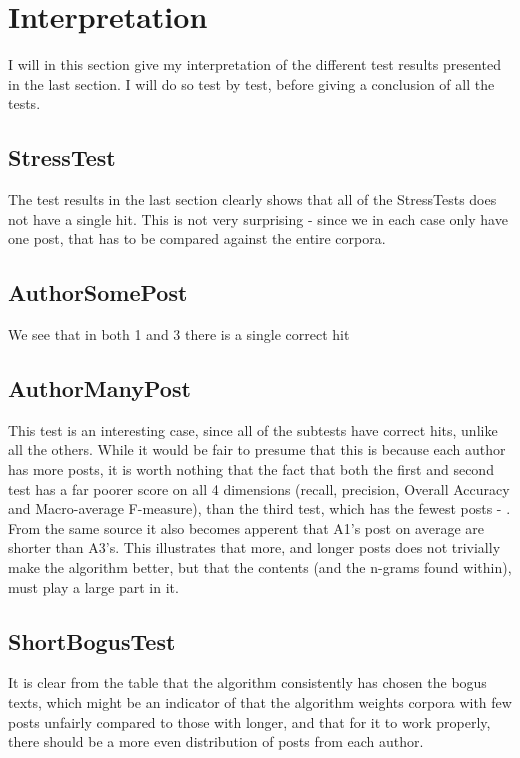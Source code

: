 \section{Interpretation}
\label{interpretation}
I will in this section give my interpretation of the different test results presented in the last section. I will do so test by test, before giving a conclusion of all the tests.

\subsection{StressTest}
The test results in the last section clearly shows that all of the StressTests does not have a single hit. This is not very surprising - since we in each case only have one post, that has to be compared against the entire corpora.

\subsection{AuthorSomePost}
We see that in both 1 and 3 there is a single correct hit

\subsection{AuthorManyPost}
This test is an interesting case, since all of the subtests have correct hits, unlike all the others. While it would be fair to presume that this is because each author has more posts, it is worth nothing that the fact that both the first and second test has a far poorer score on all 4 dimensions (recall, precision, Overall Accuracy and Macro-average F-measure), than the third test, which has the fewest posts - . From the same source it also becomes apperent that A1's post on average are shorter than A3's. This illustrates that more, and longer posts does not trivially make the algorithm better, but that the contents (and the n-grams found within), must play a large part in it.

\subsection{ShortBogusTest}
It is clear from the table that the algorithm consistently has chosen the bogus texts, which might be an indicator of that the algorithm weights corpora with few posts unfairly compared to those with longer, and that for it to work properly, there should be a more even distribution of posts from each author.\\

